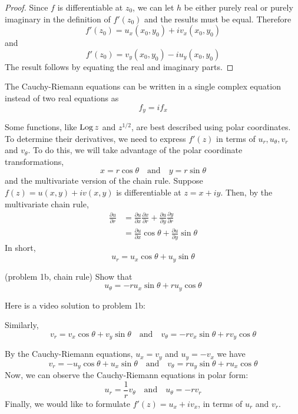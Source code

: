 \documentclass[handout]{ximera}
\begin{document}
\begin{proof}
Since $f$ is differentiable at $z_0$, we can let $h$ be either purely real or 
purely imaginary in the definition of $f'(z_0)$
and the results must be equal. Therefore
\[
f'(z_0) = u_x(x_0,y_0)+iv_x(x_0,y_0)
\]
and
\[
f'(z_0) = v_y(x_0,y_0)-iu_y(x_0,y_0)
\]
The result follows by equating the real and imaginary parts.
\end{proof}
\begin{remark}
The Cauchy-Riemann equations can be written in a single complex equation instead of two real equations as
\[
f_y = if_x
\]
\end{remark}

Some functions, like $\operatorname{Log} z$ and $z^{1/2}$, are best described using polar coordinates. 
To determine their derivatives, we need 
to express $f'(z)$ in terms of $u_r, u_\theta, v_r$ and $v_\theta$. 
To do this, we will take advantage of the polar coordinate transformations,
\[
x = r\cos \theta \quad \mbox{and} \quad y=r\sin \theta
\]
and the multivariate version of the chain rule.
Suppose $f(z) = u(x,y) + iv(x,y)$ is differentiable at $z = x+iy$.
Then, by the multivariate chain rule,
\begin{align*}
\frac{\partial u}{\partial r} &= \frac{\partial u}{\partial x}\frac{\partial x}{\partial r}+\frac{\partial u}{\partial y}\frac{\partial y}{\partial r}\\
                              &= \frac{\partial u}{\partial x} \cos\theta + \frac{\partial u}{\partial y} \sin \theta
\end{align*}
In short,
\[
u_r = u_x \cos \theta + u_y \sin\theta
\]


\begin{problem}(problem 1b, chain rule)
Show that
\[
u_\theta = -ru_x \sin \theta + ru_y \cos\theta
\]
\end{problem}

Here is a video solution to problem 1b:\\
\begin{foldable}
\end{foldable}

Similarly,
\[
 v_r = v_x \cos \theta + v_y \sin\theta \quad \mbox{and} \quad  v_\theta = -rv_x \sin \theta + rv_y \cos\theta
\]

By the Cauchy-Riemann equations, $u_x = v_y$ and $u_y = -v_x$ we have
\[
v_r = -u_y \cos \theta + u_x \sin\theta \quad \mbox{and} \quad  v_\theta = ru_y \sin \theta + ru_x \cos\theta
\]
Now, we can observe the Cauchy-Riemann equations in polar form:
\[
u_r = \frac{1}{r} v_\theta \quad \mbox{and} \quad u_\theta = -rv_r
\]
Finally, we would like to formulate $f'(z) = u_x + iv_x$, in terms of $u_r$ and $v_r$.
\end{document}
